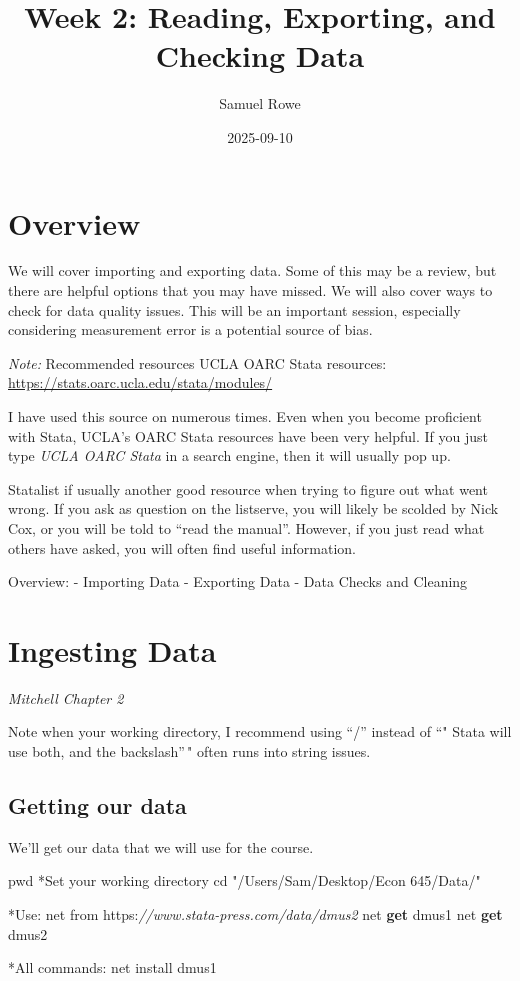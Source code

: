 \documentclass[
]{book}
\title{Week 2: Reading, Exporting, and Checking Data}
\author{Samuel Rowe}
\date{2025-09-10}
\newenvironment{Shaded}{\begin{snugshade}}{\end{snugshade}}
\newcommand{\CommentTok}[1]{\textcolor[rgb]{0.56,0.35,0.01}{\textit{#1}}}
\newcommand{\FunctionTok}[1]{\textcolor[rgb]{0.13,0.29,0.53}{\textbf{#1}}}
\newcommand{\NormalTok}[1]{#1}
\newcommand{\StringTok}[1]{\textcolor[rgb]{0.31,0.60,0.02}{#1}}
\begin{document}
\maketitle

{
\setcounter{tocdepth}{1}
\tableofcontents
}
\chapter{Overview}\label{overview}

We will cover importing and exporting data. Some of this may be a review, but there are helpful options that you may have missed. We will also cover ways to check for data quality issues. This will be an important session, especially considering measurement error is a potential source of bias.

\emph{Note: }Recommended resources
UCLA OARC Stata resources: \url{https://stats.oarc.ucla.edu/stata/modules/}

I have used this source on numerous times. Even when you become proficient with Stata, UCLA's OARC Stata resources have been very helpful. If you just type \emph{UCLA OARC Stata } in a search engine, then it will usually pop up.

Statalist if usually another good resource when trying to figure out what went wrong. If you ask as question on the listserve, you will likely be scolded by Nick Cox, or you will be told to ``read the manual''. However, if you just read what others have asked, you will often find useful information.

Overview:
- Importing Data
- Exporting Data
- Data Checks and Cleaning

\chapter{Ingesting Data}\label{ingesting-data}

\emph{Mitchell Chapter 2}

Note when your working directory, I recommend using ``/'' instead of ``"
Stata will use both, and the backslash''\," often runs into string issues.

\section{Getting our data}\label{getting-our-data}

We'll get our data that we will use for the course.

\begin{Shaded}
\begin{Highlighting}[]
\NormalTok{pwd}
\NormalTok{*Set your working directory}
\NormalTok{cd }\StringTok{"/Users/Sam/Desktop/Econ 645/Data/"}

\NormalTok{*Use:}
\NormalTok{net from https:}\CommentTok{//www.stata{-}press.com/data/dmus2}
\NormalTok{net }\FunctionTok{get}\NormalTok{ dmus1}
\NormalTok{net }\FunctionTok{get}\NormalTok{ dmus2}

\NormalTok{*All commands:}
\NormalTok{net install dmus1}
\end{Highlighting}
\end{Shaded}
\end{document}
